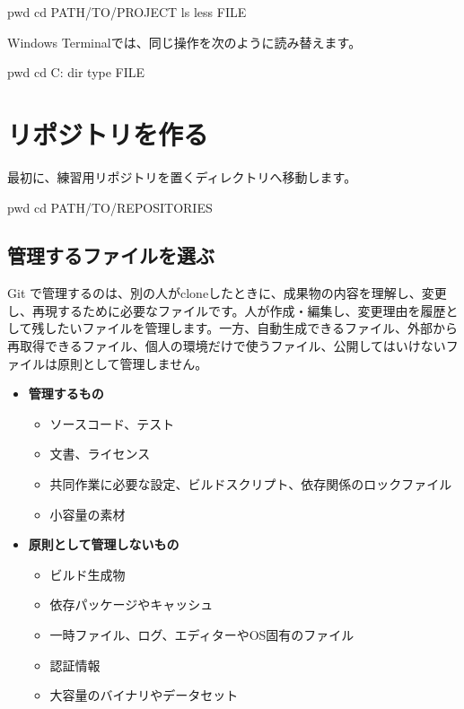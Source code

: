 \documentclass[a4paper,11pt]{jlreq}
\newcommand{\term}[1]{\textbf{#1}}
\begin{document}
\begin{codeblock}
pwd
cd PATH/TO/PROJECT
ls
less FILE
\end{codeblock}

Windows Terminalでは、同じ操作を次のように読み替えます。

\begin{codeblock}
pwd
cd C:\PATH\TO\PROJECT
dir
type FILE
\end{codeblock}

\section{リポジトリを作る}

最初に、練習用リポジトリを置くディレクトリへ移動します。

\begin{codeblock}
pwd
cd PATH/TO/REPOSITORIES
\end{codeblock}

\subsection{管理するファイルを選ぶ}

Git で管理するのは、別の人がcloneしたときに、成果物の内容を理解し、変更し、再現するために必要なファイルです。人が作成・編集し、変更理由を履歴として残したいファイルを管理します。一方、自動生成できるファイル、外部から再取得できるファイル、個人の環境だけで使うファイル、公開してはいけないファイルは原則として管理しません。

\begin{itemize}
  \item \term{管理するもの}
    \begin{itemize}
      \item ソースコード、テスト
      \item 文書、ライセンス
      \item 共同作業に必要な設定、ビルドスクリプト、依存関係のロックファイル
      \item 小容量の素材
    \end{itemize}
  \item \term{原則として管理しないもの}
    \begin{itemize}
      \item ビルド生成物
      \item 依存パッケージやキャッシュ
      \item 一時ファイル、ログ、エディターやOS固有のファイル
      \item 認証情報
      \item 大容量のバイナリやデータセット
    \end{itemize}
\end{itemize}
\end{document}
